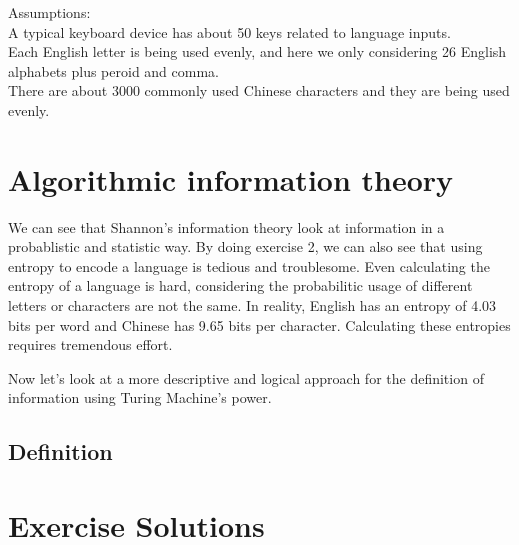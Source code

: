 \documentclass[12pt]{article}
\begin{document}
Assumptions:\\
A typical keyboard device has about 50 keys related to language inputs.\\
Each English letter is being used evenly, and here we only considering 26 English alphabets plus peroid and comma.\\
There are about 3000 commonly used Chinese characters and they are being used evenly.\\

\section{Algorithmic information theory}
We can see that Shannon's information theory look at information in a probablistic and statistic way. By doing exercise 2, we can also see that using entropy to encode a language is tedious and troublesome. Even calculating the entropy of a language is hard, considering the probabilitic usage of different letters or characters are not the same. In reality, English has an entropy of 4.03 bits per word and Chinese has 9.65 bits per character. Calculating these entropies requires tremendous effort.

Now let's look at a more descriptive and logical approach for the definition of information using Turing Machine's power.

\subsection{Definition}

\section{Exercise Solutions}
\end{document}
